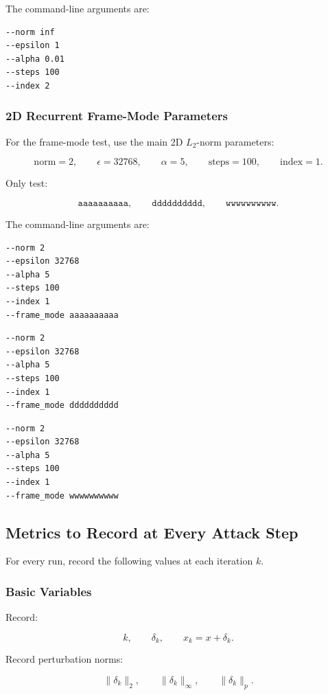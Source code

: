 \documentclass{article}
\begin{document}
The command-line arguments are:

\begin{verbatim}
--norm inf
--epsilon 1
--alpha 0.01
--steps 100
--index 2
\end{verbatim}

\subsubsection{2D Recurrent Frame-Mode Parameters}

For the frame-mode test, use the main 2D \(L_2\)-norm parameters:

\[
\text{norm}=2,
\qquad
\epsilon=32768,
\qquad
\alpha=5,
\qquad
\text{steps}=100,
\qquad
\text{index}=1.
\]

Only test:

\[
\texttt{aaaaaaaaaa},
\qquad
\texttt{dddddddddd},
\qquad
\texttt{wwwwwwwwww}.
\]

The command-line arguments are:

\begin{verbatim}
--norm 2
--epsilon 32768
--alpha 5
--steps 100
--index 1
--frame_mode aaaaaaaaaa
\end{verbatim}

\begin{verbatim}
--norm 2
--epsilon 32768
--alpha 5
--steps 100
--index 1
--frame_mode dddddddddd
\end{verbatim}

\begin{verbatim}
--norm 2
--epsilon 32768
--alpha 5
--steps 100
--index 1
--frame_mode wwwwwwwwww
\end{verbatim}

\subsection{Metrics to Record at Every Attack Step}

For every run, record the following values at each iteration \(k\).

\subsubsection{Basic Variables}

Record:

\[
k,
\qquad
\delta_k,
\qquad
x_k=x+\delta_k.
\]

Record perturbation norms:

\[
\|\delta_k\|_2,
\qquad
\|\delta_k\|_\infty,
\qquad
\|\delta_k\|_p.
\]
\end{document}
